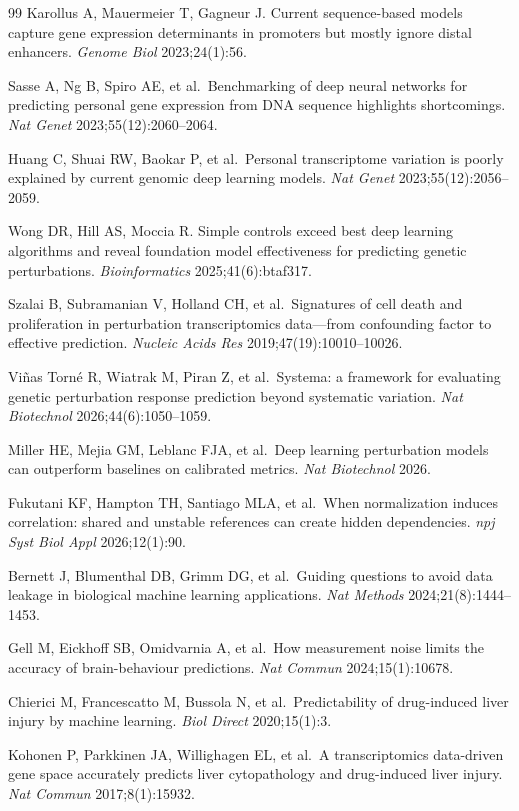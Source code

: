 \documentclass[11pt,a4paper]{article}
\begin{document}
\begin{thebibliography}{99}
Karollus A, Mauermeier T, Gagneur J. Current sequence-based models capture gene expression determinants in promoters but mostly ignore distal enhancers. \emph{Genome Biol} 2023;24(1):56.

Sasse A, Ng B, Spiro AE, et al.~Benchmarking of deep neural networks for predicting personal gene expression from DNA sequence highlights shortcomings. \emph{Nat Genet} 2023;55(12):2060--2064.

Huang C, Shuai RW, Baokar P, et al.~Personal transcriptome variation is poorly explained by current genomic deep learning models. \emph{Nat Genet} 2023;55(12):2056--2059.

Wong DR, Hill AS, Moccia R. Simple controls exceed best deep learning algorithms and reveal foundation model effectiveness for predicting genetic perturbations. \emph{Bioinformatics} 2025;41(6):btaf317.

Szalai B, Subramanian V, Holland CH, et al.~Signatures of cell death and proliferation in perturbation transcriptomics data---from confounding factor to effective prediction. \emph{Nucleic Acids Res} 2019;47(19):10010--10026.

Viñas Torné R, Wiatrak M, Piran Z, et al.~Systema: a framework for evaluating genetic perturbation response prediction beyond systematic variation. \emph{Nat Biotechnol} 2026;44(6):1050--1059.

Miller HE, Mejia GM, Leblanc FJA, et al.~Deep learning perturbation models can outperform baselines on calibrated metrics. \emph{Nat Biotechnol} 2026.

Fukutani KF, Hampton TH, Santiago MLA, et al.~When normalization induces correlation: shared and unstable references can create hidden dependencies. \emph{npj Syst Biol Appl} 2026;12(1):90.

Bernett J, Blumenthal DB, Grimm DG, et al.~Guiding questions to avoid data leakage in biological machine learning applications. \emph{Nat Methods} 2024;21(8):1444--1453.

Gell M, Eickhoff SB, Omidvarnia A, et al.~How measurement noise limits the accuracy of brain-behaviour predictions. \emph{Nat Commun} 2024;15(1):10678.

Chierici M, Francescatto M, Bussola N, et al.~Predictability of drug-induced liver injury by machine learning. \emph{Biol Direct} 2020;15(1):3.

Kohonen P, Parkkinen JA, Willighagen EL, et al.~A transcriptomics data-driven gene space accurately predicts liver cytopathology and drug-induced liver injury. \emph{Nat Commun} 2017;8(1):15932.


\end{thebibliography}
\end{document}
